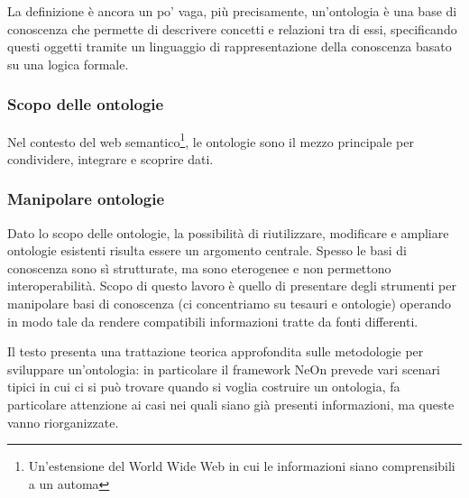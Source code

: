 La definizione è ancora un po' vaga, più precisamente, un'ontologia è una base di conoscenza che permette di descrivere concetti e relazioni tra di essi, specificando questi oggetti tramite un linguaggio di rappresentazione della conoscenza basato su una logica formale.
\subsubsection{Scopo delle ontologie}
Nel contesto del web semantico\footnote{Un'estensione del World Wide Web in cui le informazioni siano comprensibili a un automa\cite{berners2001new}}, le ontologie sono il mezzo principale per condividere, integrare e scoprire dati\cite{hitzler2021review}.
\subsubsection{Manipolare ontologie}
 Dato lo scopo delle ontologie, la possibilità di riutilizzare, modificare e ampliare ontologie esistenti risulta essere un argomento centrale. Spesso le basi di conoscenza sono sì strutturate, ma sono eterogenee e non permettono interoperabilità. Scopo di questo lavoro è quello di presentare degli strumenti per manipolare basi di conoscenza (ci concentriamo su tesauri e ontologie) operando in modo tale da rendere compatibili informazioni tratte da fonti differenti. 
 
 Il testo \cite{suarez2015neon} presenta una trattazione teorica approfondita sulle metodologie per sviluppare un'ontologia: in particolare il framework NeOn prevede vari scenari tipici in cui ci si può trovare quando si voglia costruire un ontologia, fa particolare attenzione ai casi nei quali siano già presenti informazioni, ma queste vanno riorganizzate.
